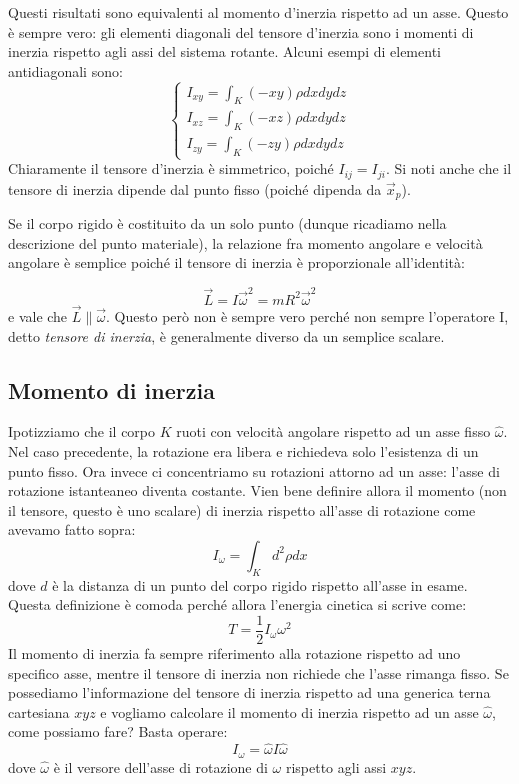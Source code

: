 \documentclass[a4paper,openany]{article}
\begin{document}
	Questi risultati sono equivalenti al momento d'inerzia rispetto ad un asse. Questo è sempre vero: gli elementi diagonali del tensore d'inerzia sono i momenti di inerzia rispetto agli assi del sistema rotante. Alcuni esempi di elementi antidiagonali sono:
	\begin{equation}\label{key}
		\begin{cases}
			I_{xy} = \int_{K}(-xy)\rho dxdydz  \\
			I_{xz} = \int_{K}(-xz)\rho dxdydz \\
			I_{zy} = \int_{K}(-zy)\rho dxdydz 
		\end{cases}
	\end{equation}
	Chiaramente il tensore d'inerzia è simmetrico, poiché $I_{ij} = I_{ji}$. Si noti anche che il tensore di inerzia dipende dal punto fisso (poiché dipenda da $\vec{x}_p$).
	
	Se il corpo rigido è costituito da un solo punto (dunque ricadiamo nella descrizione del punto materiale), la relazione fra momento angolare e velocità angolare è semplice poiché il tensore di inerzia è proporzionale all'identità:
	
	$$
	\vec{L} = I\vec{\omega}^{2} = mR^{2} \vec{\omega}^{2}
	$$
	e vale che $\vec{L} \parallel \vec{\omega}$. Questo però non è sempre vero perché non sempre l'operatore I, detto \textit{tensore di inerzia}, è generalmente diverso da un semplice scalare.
	\subsection{Momento di inerzia}
	Ipotizziamo che il corpo $K$ ruoti con velocità angolare rispetto ad un asse fisso $\hat{\omega}$. Nel caso precedente, la rotazione era libera e richiedeva solo l'esistenza di un punto fisso. Ora invece ci concentriamo su rotazioni attorno ad un asse: l'asse di rotazione istanteaneo diventa costante. Vien bene definire allora il momento (non il tensore, questo è uno scalare) di inerzia rispetto all'asse di rotazione come avevamo fatto sopra:
	$$
	I_{\omega} = \int_{K}d^{2}\rho dx
	$$
	dove $d$ è la distanza di un punto del corpo rigido rispetto all'asse in esame. Questa definizione è comoda perché allora l'energia cinetica si scrive come:
	\begin{equation}
		T = \dfrac{1}{2}I_{\omega}\omega^2
		\label{MomInerzia}
	\end{equation}
	Il momento di inerzia fa sempre riferimento alla rotazione rispetto ad uno specifico asse, mentre il tensore di inerzia non richiede che l'asse rimanga fisso. Se possediamo l'informazione del tensore di inerzia rispetto ad una generica terna cartesiana $xyz$ e vogliamo calcolare il momento di inerzia rispetto ad un asse $\hat{\omega}$, come possiamo fare? Basta operare:
	$$
	I_{\omega} = \hat{\omega}I\hat{\omega}
	$$
	dove $\hat\omega$ è il versore dell'asse di rotazione di $\omega$ rispetto agli assi $xyz$.
	
\end{document}
